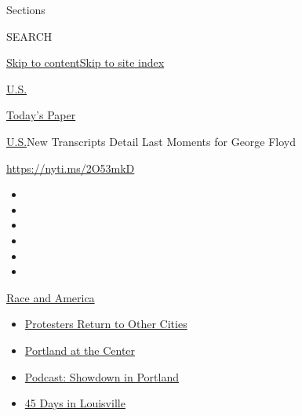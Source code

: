 Sections

SEARCH

\protect\hyperlink{site-content}{Skip to
content}\protect\hyperlink{site-index}{Skip to site index}

\href{https://www.nytimes3xbfgragh.onion/section/us}{U.S.}

\href{https://myaccount.nytimes3xbfgragh.onion/auth/login?response_type=cookie\&client_id=vi}{}

\href{https://www.nytimes3xbfgragh.onion/section/todayspaper}{Today's
Paper}

\href{/section/us}{U.S.}\textbar{}New Transcripts Detail Last Moments
for George Floyd

\url{https://nyti.ms/2O53mkD}

\begin{itemize}
\item
\item
\item
\item
\item
\item
\end{itemize}

\href{https://www.nytimes3xbfgragh.onion/news-event/george-floyd-protests-minneapolis-new-york-los-angeles?action=click\&pgtype=Article\&state=default\&region=TOP_BANNER\&context=storylines_menu}{Race
and America}

\begin{itemize}
\tightlist
\item
  \href{https://www.nytimes3xbfgragh.onion/2020/07/26/us/protests-portland-seattle-trump.html?action=click\&pgtype=Article\&state=default\&region=TOP_BANNER\&context=storylines_menu}{Protesters
  Return to Other Cities}
\item
  \href{https://www.nytimes3xbfgragh.onion/2020/07/24/us/portland-oregon-protests-white-race.html?action=click\&pgtype=Article\&state=default\&region=TOP_BANNER\&context=storylines_menu}{Portland
  at the Center}
\item
  \href{https://www.nytimes3xbfgragh.onion/2020/07/23/podcasts/the-daily/portland-protests.html?action=click\&pgtype=Article\&state=default\&region=TOP_BANNER\&context=storylines_menu}{Podcast:
  Showdown in Portland}
\item
  \href{https://www.nytimes3xbfgragh.onion/interactive/2020/07/16/us/black-lives-matter-protests-louisville-breonna-taylor.html?action=click\&pgtype=Article\&state=default\&region=TOP_BANNER\&context=storylines_menu}{45
  Days in Louisville}
\end{itemize}

